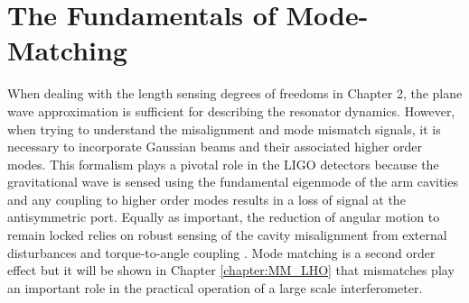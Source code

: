 \chapter{The Fundamentals of Mode-Matching}\label{chap:fund_mm}
		When dealing with the length sensing degrees of freedoms in Chapter 2, the plane wave approximation is sufficient for describing the resonator dynamics. However, when trying to understand the misalignment and mode mismatch signals, it is necessary to incorporate Gaussian beams and their associated higher order modes. This formalism plays a pivotal role in the LIGO detectors because the gravitational wave is sensed using the fundamental eigenmode of the arm cavities and any coupling to higher order modes results in a loss of signal at the antisymmetric port.  Equally as important, the reduction of angular motion to remain locked relies on robust sensing of the cavity misalignment from external disturbances \cite{Fritschel_alignment} and torque-to-angle coupling \cite{SiggSidle}.  Mode matching is a second order effect but it will be shown in Chapter \ref{chapter:MM_LHO} that mismatches play an important role in the practical operation of a large scale interferometer.
			
